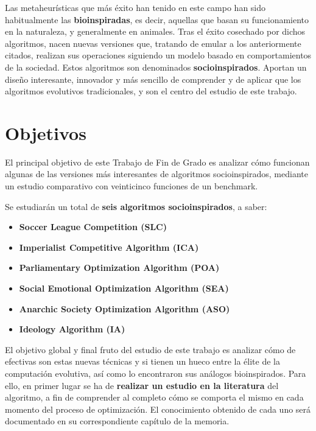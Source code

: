 Las metaheurísticas que más éxito han tenido en este campo han sido habitualmente las \textbf{bioinspiradas}, es decir, aquellas que basan su funcionamiento en la naturaleza, y generalmente en animales. Tras el éxito cosechado por dichos algoritmos, nacen nuevas versiones que, tratando de emular a los anteriormente citados, realizan sus operaciones siguiendo un modelo basado en comportamientos de la sociedad. Estos algoritmos son denominados \textbf{socioinspirados}. Aportan un diseño interesante, innovador y más sencillo de comprender y de aplicar que los algoritmos evolutivos tradicionales, y son el centro del estudio de este trabajo.

\section{Objetivos}

El principal objetivo de este Trabajo de Fin de Grado es analizar cómo funcionan algunas de las versiones más interesantes de algoritmos socioinspirados, mediante un estudio comparativo con veinticinco funciones de un benchmark. 

Se estudiarán un total de \textbf{seis algoritmos socioinspirados}, a saber:

\begin{itemize}
	\item \textbf{Soccer League Competition (SLC)} \cite{slc-article}
	\item \textbf{Imperialist Competitive Algorithm (ICA)} \cite{ica-conference}
	\item \textbf{Parliamentary Optimization Algorithm (POA)} \cite{poa-article}
	\item \textbf{Social Emotional Optimization Algorithm (SEA)} \cite{sea-chapter}
	\item \textbf{Anarchic Society Optimization Algorithm (ASO)} \cite{aso-article} \cite{aso-chapter}
	\item \textbf{Ideology Algorithm (IA)} \cite{ia-article}
\end{itemize}

El objetivo global y final fruto del estudio de este trabajo es analizar cómo de efectivas son estas nuevas técnicas y si tienen un hueco entre la élite de la computación evolutiva, así como lo encontraron sus análogos bioinspirados. Para ello, en primer lugar se ha de \textbf{realizar un estudio en la literatura} del algoritmo, a fin de comprender al completo cómo se comporta el mismo en cada momento del proceso de optimización. El conocimiento obtenido de cada uno será documentado en su correspondiente capítulo de la memoria.

